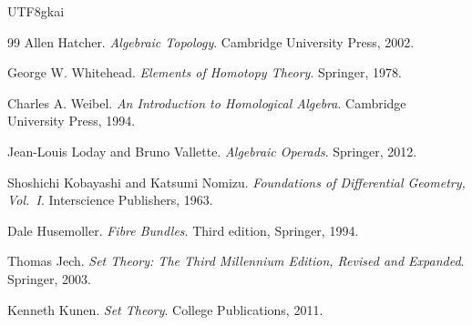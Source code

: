 \documentclass[12pt]{article}
\begin{document}
\begin{CJK*}{UTF8}{gkai}
\begin{thebibliography}{99}
Allen Hatcher.
\newblock \emph{Algebraic Topology}.
\newblock Cambridge University Press, 2002.

George W. Whitehead.
\newblock \emph{Elements of Homotopy Theory}.
\newblock Springer, 1978.

Charles A. Weibel.
\newblock \emph{An Introduction to Homological Algebra}.
\newblock Cambridge University Press, 1994.

Jean-Louis Loday and Bruno Vallette.
\newblock \emph{Algebraic Operads}.
\newblock Springer, 2012.

Shoshichi Kobayashi and Katsumi Nomizu.
\newblock \emph{Foundations of Differential Geometry, Vol.~I}.
\newblock Interscience Publishers, 1963.

Dale Husemoller.
\newblock \emph{Fibre Bundles}.
\newblock Third edition, Springer, 1994.

Thomas Jech.
\newblock \emph{Set Theory: The Third Millennium Edition, Revised and Expanded}.
\newblock Springer, 2003.

Kenneth Kunen.
\newblock \emph{Set Theory}.
\newblock College Publications, 2011.

\end{thebibliography}

\end{CJK*}
\end{document}
